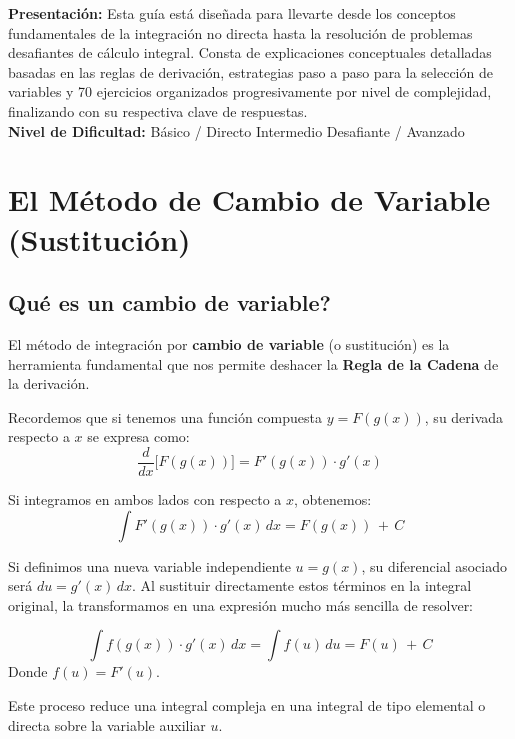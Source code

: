 \documentclass[12pt, letterpaper]{article}
\newcommand{\dx}{\,dx}
\newcommand{\du}{\,du}
\newcommand{\CC}{\,+\,C}
\begin{document}


\vspace{4pt}
\begin{cuadroinfo}
\small
\textbf{Presentación:} Esta guía está diseñada para llevarte desde los conceptos fundamentales de la integración no directa hasta la resolución de problemas desafiantes de cálculo integral.
Consta de explicaciones conceptuales detalladas basadas en las reglas de derivación, estrategias paso a paso para la selección de variables y 70 ejercicios organizados progresivamente por nivel de complejidad, finalizando con su respectiva clave de respuestas.
\\[4pt]
\textbf{Nivel de Dificultad:}\quad
\facil{} Básico / Directo \quad
\medio{} Intermedio \quad
\dificil{} Desafiante / Avanzado
\end{cuadroinfo}

\vspace{8pt}

\section{El Método de Cambio de Variable (Sustitución)}

\subsection{\textquestiondown Qué es un cambio de variable?}
El método de integración por \textbf{cambio de variable} (o sustitución) es la herramienta fundamental que nos permite deshacer la \textbf{Regla de la Cadena} de la derivación.

Recordemos que si tenemos una función compuesta $y = F(g(x))$, su derivada respecto a $x$ se expresa como:
$$\frac{d}{dx} \big[ F(g(x)) \big] = F'(g(x)) \cdot g'(x)$$

Si integramos en ambos lados con respecto a $x$, obtenemos:
$$\int F'(g(x)) \cdot g'(x) \dx = F(g(x)) \CC$$

Si definimos una nueva variable independiente $u = g(x)$, su diferencial asociado será $du = g'(x)\dx$. Al sustituir directamente estos términos en la integral original, la transformamos en una expresión mucho más sencilla de resolver:
\begin{cuadroteoria}
$$\int f(g(x)) \cdot g'(x) \dx = \int f(u) \du = F(u) \CC$$
Donde $f(u) = F'(u)$.
\end{cuadroteoria}
Este proceso reduce una integral compleja en una integral de tipo elemental o directa sobre la variable auxiliar $u$.
\end{document}
